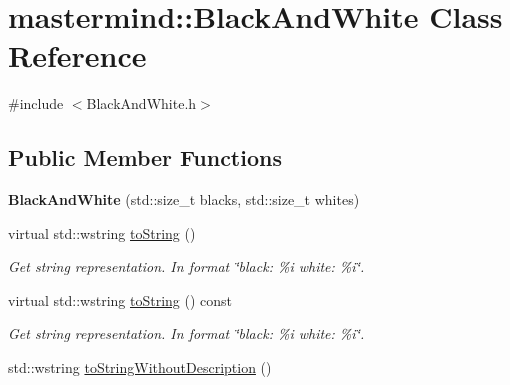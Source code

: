 \hypertarget{classmastermind_1_1_black_and_white}{}\section{mastermind\+:\+:Black\+And\+White Class Reference}
\label{classmastermind_1_1_black_and_white}


{\ttfamily \#include $<$Black\+And\+White.\+h$>$}

\subsection*{Public Member Functions}
\begin{DoxyCompactItemize}
\item 
\hypertarget{classmastermind_1_1_black_and_white_aedecdf7875c538b7fa66a01a413404cd}{}\label{classmastermind_1_1_black_and_white_aedecdf7875c538b7fa66a01a413404cd} 
{\bfseries Black\+And\+White} (std\+::size\+\_\+t blacks, std\+::size\+\_\+t whites)
\item 
\hypertarget{classmastermind_1_1_black_and_white_ae74a18bd019f47f33c8b3c8dd2a01ea8}{}\label{classmastermind_1_1_black_and_white_ae74a18bd019f47f33c8b3c8dd2a01ea8} 
virtual std\+::wstring \hyperlink{classmastermind_1_1_black_and_white_ae74a18bd019f47f33c8b3c8dd2a01ea8}{to\+String} ()
\begin{DoxyCompactList}\small\item\em Get string representation. In format \char`\"{}black\+: \%i white\+: \%i\char`\"{}. \end{DoxyCompactList}\item 
\hypertarget{classmastermind_1_1_black_and_white_acfd7c48583ff474a29f8be8c2fd641d0}{}\label{classmastermind_1_1_black_and_white_acfd7c48583ff474a29f8be8c2fd641d0} 
virtual std\+::wstring \hyperlink{classmastermind_1_1_black_and_white_acfd7c48583ff474a29f8be8c2fd641d0}{to\+String} () const
\begin{DoxyCompactList}\small\item\em Get string representation. In format \char`\"{}black\+: \%i white\+: \%i\char`\"{}. \end{DoxyCompactList}\item 
\hypertarget{classmastermind_1_1_black_and_white_a0236bf88cd56096a905edffdbcad609a}{}\label{classmastermind_1_1_black_and_white_a0236bf88cd56096a905edffdbcad609a} 
std\+::wstring \hyperlink{classmastermind_1_1_black_and_white_a0236bf88cd56096a905edffdbcad609a}{to\+String\+Without\+Description} ()

\end{DoxyCompactItemize}
